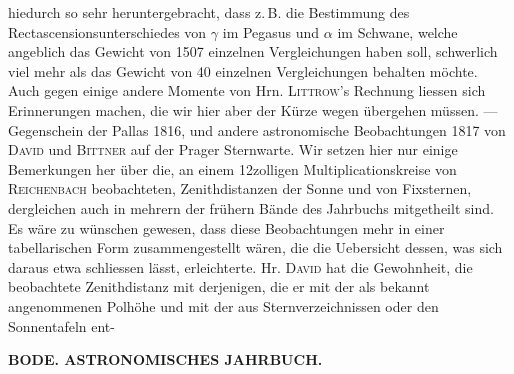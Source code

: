 hiedurch so sehr heruntergebracht, dass z.\,B. die Bestimmung des Rectascensionsunterschiedes von $\gamma$ im Pegasus und $\alpha$ im Schwane, welche angeblich das Gewicht von 1507 einzelnen Vergleichungen haben soll, schwerlich viel mehr als das Gewicht von 40 einzelnen Vergleichungen behalten möchte. Auch gegen einige andere Momente von Hrn. \textsc{Littrow}'s Rechnung liessen sich Erinnerungen machen, die wir hier aber der Kürze wegen übergehen müssen. --- Gegenschein der Pallas 1816, und andere astronomische Beobachtungen 1817 von \textsc{David} und \textsc{Bittner} auf der Prager Sternwarte. Wir setzen hier nur einige Bemerkungen her über die, an einem 12zolligen Multiplicationskreise von \textsc{Reichenbach} beobachteten, Zenithdistanzen der Sonne und von Fixsternen, dergleichen auch in mehrern der frühern Bände des Jahrbuchs mitgetheilt sind. Es wäre zu wünschen gewesen, dass diese Beobachtungen mehr in einer tabellarischen Form zusammengestellt wären, die die Uebersicht dessen, was sich daraus etwa schliessen lässt, erleichterte. Hr. \textsc{David} hat die Gewohnheit, die beobachtete Zenithdistanz mit derjenigen, die er mit der als bekannt angenommenen Polhöhe und mit der aus Sternverzeichnissen oder den Sonnentafeln ent-\par
\clearpage
{}
\noindent\makebox[10mm][l]{}%
\parbox[b]{\dimexpr\textwidth-20mm\relax}{\centering\small\textbf{BODE. ASTRONOMISCHES JAHRBUCH.}}%
\par\nobreak\medskip
